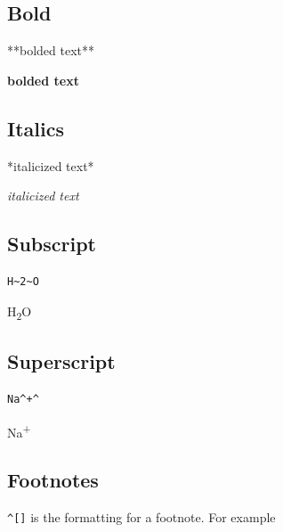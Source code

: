 \documentclass[
]{book}
\newenvironment{Shaded}{\begin{snugshade}}{\end{snugshade}}
\newcommand{\NormalTok}[1]{#1}
\theoremstyle{definition}
\theoremstyle{definition}
\theoremstyle{definition}
\theoremstyle{definition}
\theoremstyle{remark}
\begin{document}
\subsection*{Bold}\label{bold}

\begin{Shaded}
\begin{Highlighting}[]
\NormalTok{**bolded text**}
\end{Highlighting}
\end{Shaded}

\textbf{bolded text}

\subsection*{Italics}\label{italics}

\begin{Shaded}
\begin{Highlighting}[]
\NormalTok{*italicized text*}
\end{Highlighting}
\end{Shaded}

\emph{italicized text}

\subsection*{Subscript}\label{subscript}

\begin{verbatim}
H~2~O
\end{verbatim}

H\textsubscript{2}O

\subsection*{Superscript}\label{superscript}

\begin{verbatim}
Na^+^
\end{verbatim}

Na\textsuperscript{+}

\subsection*{Footnotes}\label{footnotes}

\texttt{\^{}{[}{]}} is the formatting for a footnote. For example
\end{document}
